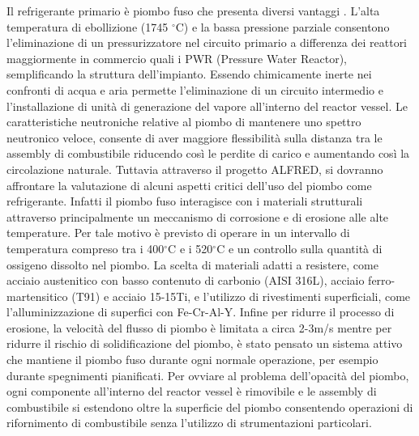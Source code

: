Il refrigerante primario è piombo fuso che presenta diversi vantaggi 
\cite{nurethalfred}. L'alta temperatura di ebollizione (1745 $^\circ$C) e la bassa 
pressione parziale consentono l'eliminazione di un pressurizzatore nel circuito 
primario a differenza dei reattori maggiormente in commercio quali i PWR 
(Pressure Water Reactor), semplificando la struttura dell'impianto. 
Essendo chimicamente inerte nei confronti di acqua e aria permette 
l'eliminazione di un circuito intermedio e l'installazione di unità di 
generazione del vapore all'interno del reactor vessel.
Le caratteristiche neutroniche relative al piombo di mantenere uno spettro 
neutronico veloce, consente di aver maggiore flessibilità sulla distanza tra le 
assembly di combustibile riducendo così le perdite di carico e aumentando così 
la circolazione naturale.
Tuttavia attraverso il progetto ALFRED, si dovranno affrontare la valutazione 
di 
alcuni aspetti critici dell'uso del piombo come refrigerante.
Infatti il piombo fuso interagisce con i materiali strutturali attraverso 
principalmente un meccanismo di corrosione e di erosione alle alte temperature.
Per tale motivo è previsto di operare in un intervallo di temperatura compreso 
tra i 400$^\circ$C e i 520$^\circ$C e un controllo sulla quantità di ossigeno dissolto 
nel piombo. 
La scelta di materiali adatti a resistere, come acciaio austenitico con basso 
contenuto di carbonio (AISI 316L), acciaio ferro-martensitico (T91) e acciaio 
15-15Ti, e l'utilizzo di rivestimenti superficiali, come l'alluminizzazione di 
superfici con Fe-Cr-Al-Y.
Infine per ridurre il processo di erosione, la velocità del flusso di piombo è 
limitata a circa 2-3m/s mentre per ridurre il rischio di solidificazione del 
piombo, è stato pensato un sistema attivo che mantiene il piombo fuso durante 
ogni normale operazione, per esempio durante spegnimenti pianificati.
Per ovviare al problema dell'opacità del piombo, ogni componente all'interno 
del 
reactor vessel è rimovibile e le assembly di combustibile si estendono oltre 
la superficie del piombo consentendo operazioni di rifornimento di combustibile 
senza l'utilizzo di strumentazioni particolari. 